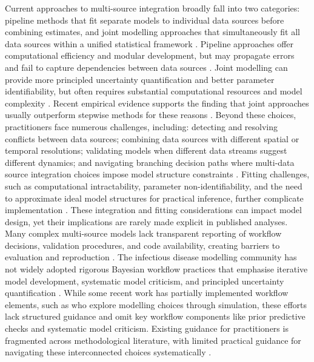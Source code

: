 \documentclass{article}
\begin{document}
Current approaches to multi-source integration broadly fall into two categories: pipeline methods that fit separate models to individual data sources before combining estimates, and joint modelling approaches that simultaneously fit all data sources within a unified statistical framework \citep{deangelis2018analysing, russell2024combined}.
Pipeline approaches offer computational efficiency and modular development, but may propagate errors and fail to capture dependencies between data sources \citep{lison2024generative, Ward2024-sp}.
Joint modelling can provide more principled uncertainty quantification and better parameter identifiability, but often requires substantial computational resources and model complexity \citep{russell2024combined, lison2024generative}.
Recent empirical evidence supports the finding that joint approaches usually outperform stepwise methods for these reasons \citep{lison2024generative}.
Beyond these choices, practitioners face numerous challenges, including: detecting and resolving conflicts between data sources; combining data sources with different spatial or temporal resolutions; validating models when different data streams suggest different dynamics; and navigating branching decision paths where multi-data source integration choices impose model structure constraints \citep{deangelis2018analysing, nicholson2022interoperability}.
Fitting challenges, such as computational intractability, parameter non-identifiability, and the need to approximate ideal model structures for practical inference, further complicate implementation \citep{corbella2022inferring, Ward2024-sp}.
These integration and fitting considerations can impact model design, yet their implications are rarely made explicit in published analyses.
Many complex multi-source models lack transparent reporting of workflow decisions, validation procedures, and code availability, creating barriers to evaluation and reproduction \citep{Ward2024-sp, Fyles2024-qz, Abbott2021-delta, Abbott2022-prevalence}.
The infectious disease modelling community has not widely adopted rigorous Bayesian workflow practices that emphasise iterative model development, systematic model criticism, and principled uncertainty quantification \citep{gelman2020bayesian, nicholson2022interoperability}.
While some recent work has partially implemented workflow elements, such as \citet{bouman2024bayesian} who explore modelling choices through simulation, these efforts lack structured guidance and omit key workflow components like prior predictive checks and systematic model criticism.
Existing guidance for practitioners is fragmented across methodological literature, with limited practical guidance for navigating these interconnected choices systematically \citep{nicholson2022interoperability, deangelis2018analysing}.
\end{document}
